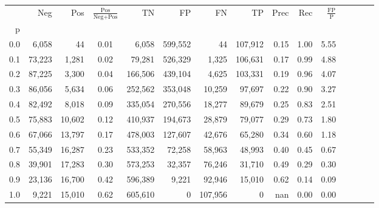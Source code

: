 \begin{tabular}{rrrcrrrrrrrrrrr}
\toprule
{} &     Neg &     Pos & $\frac{\text{Pos}}{\text{Neg}+\text{Pos}}$ &       TN &       FP &       FN &       TP &  Prec &   Rec & $\frac{\text{FP}}{\text{P}}$ \\
p   &         &         &                                            &          &          &          &          &       &       &                              \\
\midrule
0.0 &   6,058 &      44 &                                       0.01 &    6,058 &  599,552 &       44 &  107,912 &  0.15 &  1.00 &                         5.55 \\
0.1 &  73,223 &   1,281 &                                       0.02 &   79,281 &  526,329 &    1,325 &  106,631 &  0.17 &  0.99 &                         4.88 \\
0.2 &  87,225 &   3,300 &                                       0.04 &  166,506 &  439,104 &    4,625 &  103,331 &  0.19 &  0.96 &                         4.07 \\
0.3 &  86,056 &   5,634 &                                       0.06 &  252,562 &  353,048 &   10,259 &   97,697 &  0.22 &  0.90 &                         3.27 \\
0.4 &  82,492 &   8,018 &                                       0.09 &  335,054 &  270,556 &   18,277 &   89,679 &  0.25 &  0.83 &                         2.51 \\
0.5 &  75,883 &  10,602 &                                       0.12 &  410,937 &  194,673 &   28,879 &   79,077 &  0.29 &  0.73 &                         1.80 \\
0.6 &  67,066 &  13,797 &                                       0.17 &  478,003 &  127,607 &   42,676 &   65,280 &  0.34 &  0.60 &                         1.18 \\
0.7 &  55,349 &  16,287 &                                       0.23 &  533,352 &   72,258 &   58,963 &   48,993 &  0.40 &  0.45 &                         0.67 \\
0.8 &  39,901 &  17,283 &                                       0.30 &  573,253 &   32,357 &   76,246 &   31,710 &  0.49 &  0.29 &                         0.30 \\
0.9 &  23,136 &  16,700 &                                       0.42 &  596,389 &    9,221 &   92,946 &   15,010 &  0.62 &  0.14 &                         0.09 \\
1.0 &   9,221 &  15,010 &                                       0.62 &  605,610 &        0 &  107,956 &        0 &   nan &  0.00 &                         0.00 \\
\bottomrule
\end{tabular}
